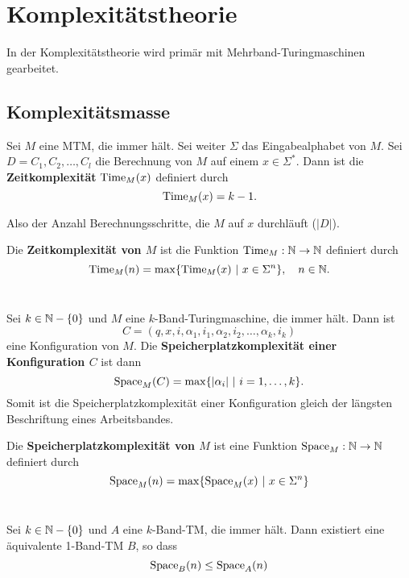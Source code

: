 \chapter{Komplexitätstheorie}
In der Komplexitätstheorie wird primär mit Mehrband-Turingmaschinen gearbeitet.

\section{Komplexitätsmasse}

\begin{definition}
Sei \(M\) eine MTM, die immer hält. Sei weiter \(\Sigma\) das Eingabealphabet von \(M\). Sei \(D = C_1, C_2, \ldots, C_l\) die Berechnung von \(M\) auf einem \(x \in \Sigma^*\). Dann ist die \textbf{Zeitkomplexität} \(\operatorname{Time}_M(x)\) definiert durch
\[
\operatorname{Time}_M(x) = k - 1.
\]

Also der Anzahl Berechnungsschritte, die \(M\) auf \(x\) durchläuft (\(|D|\)).\\
\end{definition}

\begin{definition}
Die \textbf{Zeitkomplexität von \(M\)} ist die Funktion \(\operatorname{Time}_M: \mathbb{N} \to \mathbb{N}\) definiert durch
\[
\operatorname{Time}_M(n) = \max\{\operatorname{Time}_M(x) \ |\ x \in \Sigma^n\},\quad n \in \mathbb{N}.
\]\\
\end{definition}

\begin{definition}
Sei \(k \in \mathbb{N} - \{0\}\) und \(M\) eine \(k\)-Band-Turingmaschine, die immer hält. Dann ist
\[
C = (q, x, i, \alpha_1, i_1, \alpha_2, i_2, \ldots, \alpha_k, i_k)
\]
eine Konfiguration von \(M\). Die \textbf{Speicherplatzkomplexität einer Konfiguration \(C\)} ist dann
\[
\Space_M(C) = \max \{|\alpha_i| \ |\ i = 1, \ldots, k\}.
\]
Somit ist die Speicherplatzkomplexität einer Konfiguration gleich der längsten Beschriftung eines Arbeitsbandes.\\
\end{definition}

\begin{definition}
Die \textbf{Speicherplatzkomplexität von \(M\)} ist eine Funktion \(\operatorname{Space}_M: \mathbb{N} \to \mathbb{N}\) definiert durch
\[
\operatorname{Space}_M(n) = \max \{\operatorname{Space}_M(x) \ |\ x \in \Sigma^n\}
\]\\
\end{definition}

\begin{lemma}
Sei \(k \in \mathbb{N} - \{0\}\) und \(A\) eine \(k\)-Band-TM, die immer hält. Dann existiert eine äquivalente 1-Band-TM \(B\), so dass
\[
\operatorname{Space}_B(n) \leq \operatorname{Space}_A(n)
\]\\
\end{lemma}


